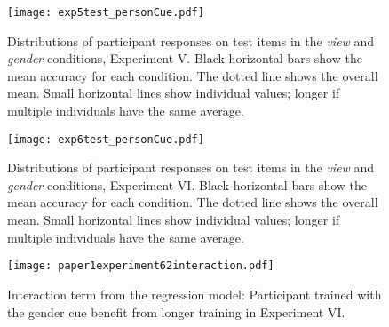 \documentclass{frontiersSCNS} %
\begin{document}
\begin{figure}[ht]
\begin{center}
\texttt{[image: exp5test\_personCue.pdf]}
\caption{ \large Distributions of participant responses on test items in the \emph{view} and \emph{gender} conditions, Experiment V. Black horizontal bars show the mean accuracy for each condition. The dotted line shows the overall mean. Small horizontal lines show individual values; longer if multiple individuals have the same average.}
\label{exp5test}
\end{center}
\end{figure}

\begin{figure}[ht]
\begin{center}
\texttt{[image: exp6test\_personCue.pdf]}
\caption{ \large Distributions of participant responses on test items in the \emph{view} and \emph{gender} conditions, Experiment VI. Black horizontal bars show the mean accuracy for each condition. The dotted line shows the overall mean. Small horizontal lines show individual values; longer if multiple individuals have the same average.}
\label{exp6test}
\end{center}
\end{figure}


\begin{figure}[ht]
\begin{center}
\texttt{[image: paper1experiment62interaction.pdf]}
\caption{ \large Interaction term from the regression model: Participant trained with the gender cue benefit from longer training in Experiment VI.}
\label{exp6int}
\end{center}
\end{figure}
\end{document}
